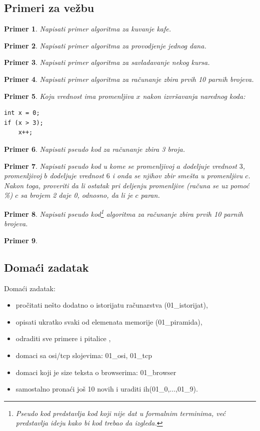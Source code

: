 \documentclass[a4paper]{article}
\newtheorem{primer}{Primer}[section]
\begin{document}
\subsection{Primeri za vežbu}
\begin{primer}
Napisati primer algoritma za kuvanje kafe.
\end{primer}
\begin{primer}
Napisati primer algoritma za provodjenje jednog dana.
\end{primer}
\begin{primer}
Napisati primer algoritma za savladavanje nekog kursa. 
\end{primer}
\begin{primer}
Napisati primer algoritma za računanje zbira prvih 10 parnih brojeva.
\end{primer}
\begin{primer}
Koju vrednost ima promenljiva $x$ nakon izvršavanja narednog koda:
\begin{lstlisting}[backgroundcolor = \color{lightgray}]
int x = 0;
if (x > 3);
    x++;
\end{lstlisting}
\end{primer}
\begin{primer}
Napisati pseudo kod za računanje zbira 3 broja.
\end{primer}
\begin{primer}
Napisati pseudo kod u kome se promenljivoj $a$ dodeljuje vrednost $3$, promenljivoj $b$ dodeljuje vrednost $6$ i onda se njihov zbir smešta u promenljivu $c$. Nakon toga, proveriti da li ostatak pri deljenju promenljive (računa se uz pomoć \%) $c$ sa brojem 2 daje 0, odnosno, da li je $c$ paran.
\end{primer}
\begin{primer}
Napisati pseudo kod\footnote{Pseudo kod predstavlja kod koji nije dat u formalnim terminima, već predstavlja ideju kako bi kod trebao da izgleda.} algoritma za računanje zbira prvih 10 parnih brojeva.
\end{primer}
\begin{primer}

\end{primer}

\subsection{Domaći zadatak}
Domaći zadatak:
\begin{itemize}
\item pročitati nešto dodatno o istorijatu računarstva (01\_istorijat), 
\item opisati ukratko svaki od elemenata memorije (01\_piramida),
\item odraditi sve primere i pitalice ,
\item domaci sa osi/tcp slojevima: 01\_osi, 01\_tcp
\item domaci koji je size teksta o browserima: 01\_browser
\item samostalno pronaći još 10 novih i uraditi ih(01\_0,...,01\_9).
\end{itemize}
\newpage
\end{document}

